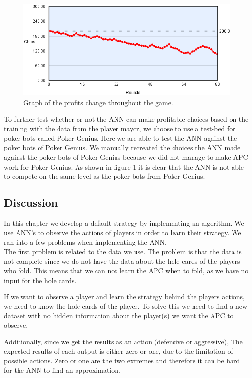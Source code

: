 \begin{figure}[H]
  \center
    \includegraphics[scale=0.7]{images/nn/finaltest.png}
  \caption{Graph of the profits change throughout the game.\label{fig:finaltest}}
\end{figure}

To further test whether or not the ANN can make profitable choices based on the training with the data from the player mayor, we choose to use a test-bed for poker bots called Poker Genius. Here we are able to test the ANN against the poker bots of Poker Genius. We manually recreated the choices the ANN made against the poker bots of Poker Genius because we did not manage to make APC work for Poker Genius. As shown in figure \ref{fig:finaltest} it is clear that the ANN is not able to compete on the same level as the poker bots from Poker Genius.


\subsection{Discussion}
In this chapter we develop a default strategy by implementing an algorithm. We use ANN's to observe the actions of players in order to learn their strategy. We ran into a few problems when implementing the ANN.\\

The first problem is related to the data we use. The problem is that  the data is not complete since we do not have the data about the hole cards of the players who fold. This means that we can not learn the APC when to fold, as we have no input for the hole cards. 

If we want to observe a player and learn the strategy behind the players actions, we need to know the hole cards of the player. To solve this we need to find a new dataset with no hidden information about the player(s) we want the APC to observe.

Additionally, since we get the results as an action (defensive or aggressive), The expected results of each output is either zero or one, due to the limitation of possible actions. Zero or one are the two extremes and therefore it can be hard for the ANN to find an approximation. 

